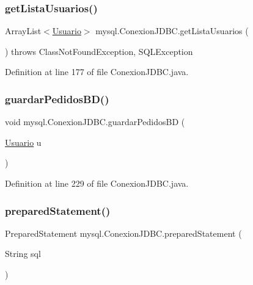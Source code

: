 \subsubsection{\texorpdfstring{get\+Lista\+Usuarios()}{getListaUsuarios()}}
{\footnotesize\ttfamily Array\+List$<$\mbox{\hyperlink{classobjetos_1_1_usuario}{Usuario}}$>$ mysql.\+Conexion\+J\+D\+B\+C.\+get\+Lista\+Usuarios (\begin{DoxyParamCaption}{ }\end{DoxyParamCaption}) throws Class\+Not\+Found\+Exception, S\+Q\+L\+Exception}



Definition at line 177 of file Conexion\+J\+D\+B\+C.\+java.

\mbox{\label{classmysql_1_1_conexion_j_d_b_c_a5dbbd093ae378b5b023127bdf0ccf88e}} 
\subsubsection{\texorpdfstring{guardar\+Pedidos\+B\+D()}{guardarPedidosBD()}}
{\footnotesize\ttfamily void mysql.\+Conexion\+J\+D\+B\+C.\+guardar\+Pedidos\+BD (\begin{DoxyParamCaption}\item[{\mbox{\hyperlink{classobjetos_1_1_usuario}{Usuario}}}]{u }\end{DoxyParamCaption})}



Definition at line 229 of file Conexion\+J\+D\+B\+C.\+java.

\mbox{\label{classmysql_1_1_conexion_j_d_b_c_a342d326d6f6c9831bb117afccb912a04}} 
\subsubsection{\texorpdfstring{prepared\+Statement()}{preparedStatement()}}
{\footnotesize\ttfamily Prepared\+Statement mysql.\+Conexion\+J\+D\+B\+C.\+prepared\+Statement (\begin{DoxyParamCaption}\item[{String}]{sql }\end{DoxyParamCaption})}



